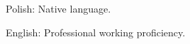 

\begin{cvskills}


  \cvskill
    {Polish: } %
    {Native language.} %

  \cvskill
    {English:} %
    {Professional working proficiency.} %




\end{cvskills}

